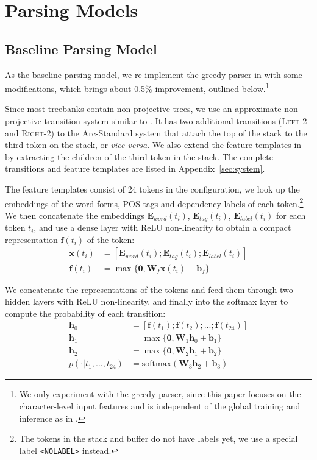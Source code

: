 \documentclass[11pt,a4paper]{article}
\begin{document}
\section{Parsing Models}

  \subsection{Baseline Parsing Model}\label{sec:baseline}
    As the baseline parsing model, we re-implement the greedy parser in \citet{Weiss:2015} with some modifications, which brings about 0.5\% improvement, outlined below.\footnote{We only experiment with the greedy parser, since this paper focuses on the character-level input features and is independent of the global training and inference as in \citet{Weiss:2015, Andor:2016}.}

    Since most treebanks contain non-projective trees, we use an approximate non-projective transition system similar to \citet{Attardi:2006}. It has two additional transitions (\textsc{Left-2} and \textsc{Right-2}) to the Arc-Standard system \citep{Nivre:2004} that attach the top of the stack to the third token on the stack, or {\em vice versa}. 
    We also extend the feature templates in \citet{Weiss:2015} by extracting the children of the third token in the stack. The complete transitions and feature templates are listed in Appendix~\ref{sec:system}.

    The feature templates consist of 24 tokens in the configuration, we look up the embeddings of the word forms, POS tags and dependency labels of each token.\footnote{The tokens in the stack and buffer do not have labels yet, we use a special label \texttt{<NOLABEL>} instead.} We then concatenate the embeddings $\mathbf{E}_{word}(t_i)$, $\mathbf{E}_{tag}(t_i)$, $\mathbf{E}_{label}(t_i)$ for each token $t_i$, and use a dense layer with ReLU non-linearity to obtain a compact representation $\mathbf{f}(t_i)$ of the token:
    \begin{align*}
    \mathbf{x}(t_i) &= [\mathbf{E}_{word}(t_i); \mathbf{E}_{tag}(t_i); \mathbf{E}_{label}(t_i)] \tag{1}\\
    \mathbf{f}(t_i) &= \max\{\mathbf{0}, \mathbf{W}_f \mathbf{x}(t_i) + \mathbf{b}_f\}
    \end{align*}

    We concatenate the representations of the tokens and feed them through two hidden layers with ReLU non-linearity, and finally into the softmax layer to compute the probability of each transition:
    \begin{align*}
      \mathbf{h}_0 &= [\mathbf{f}(t_1); \mathbf{f}(t_2); ... ; \mathbf{f}(t_{24})] \\
      \mathbf{h}_1 &= \max\{\mathbf{0}, \mathbf{W}_1 \mathbf{h}_0 + \mathbf{b}_1\} \\
      \mathbf{h}_2 &= \max\{\mathbf{0}, \mathbf{W}_2 \mathbf{h}_1 + \mathbf{b}_2\} \\
      p(\cdot | t_1, ..., t_{24}) &= \mathrm{softmax}(\mathbf{W}_3 \mathbf{h}_2 + \mathbf{b}_3)
    \end{align*}
\end{document}

